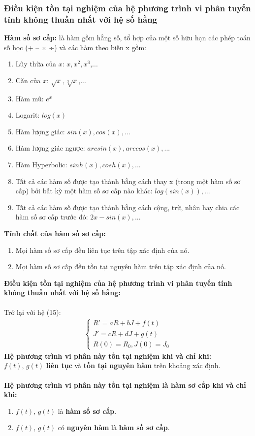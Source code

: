 \subsubsection{Điều kiện tồn tại nghiệm của hệ phương trình vi phân tuyến tính không thuần nhất với hệ số hằng}
\textbf{Hàm số sơ cấp: } là hàm gồm hằng số, tổ hợp của một số hữu hạn các phép toán số học (+ – × ÷) và các hàm theo biến x gồm:
\begin{enumerate}
    \item Lũy thừa của $x$: $x, x^2, x^3$,...
    \item Căn của $x$: $\sqrt{x}, \sqrt[3]{x}$,...
    \item Hàm mũ: $e^x$
    \item Logarit: $log(x)$
    \item Hàm lượng giác: $sin(x), cos(x),...$
    \item Hàm lượng giác ngược: $arcsin(x), arccos(x),...$
    \item Hàm Hyperbolic: $sinh(x),cosh(x),...$
    \item Tất cả các hàm số được tạo thành bằng cách thay x (trong một hàm số sơ cấp) bởi bất kỳ một hàm số sơ cấp nào khác: $log(sin(x)),...$
    \item Tất cả các hàm số được tạo thành bằng cách cộng, trừ, nhân hay chia các hàm số sơ cấp trước đó: $2x-sin(x),...$
\end{enumerate}
\textbf{Tính chất của hàm số sơ cấp:}
\begin{enumerate}
    \item Mọi hàm số sơ cấp đều liên tục trên tập xác định của nó.
    \item Mọi hàm số sơ cấp đều tồn tại nguyên hàm trên tập xác định của nó.
\end{enumerate}
\textbf{Điều kiện tồn tại nghiệm của hệ phương trình vi phân tuyến tính không
thuần nhất với hệ số hằng: }\\\\
Trở lại với hệ (15):
\begin{align*}
    \begin{cases}
        R'=aR+bJ+f(t)\\
        J'=cR+dJ+g(t)\\
        R(0)=R_0, J(0)=J_0
    \end{cases}
\end{align*}
\textbf{Hệ phương trình vi phân này tồn tại nghiệm khi và chỉ khi:}\\

$f(t)$, $g(t)$ \textbf{liên tục} và \textbf{tồn tại nguyên hàm} trên khoảng xác định.\\\\
\textbf{Hệ phương trình vi phân này tồn tại nghiệm là hàm sơ cấp khi và chỉ khi:}
\begin{enumerate}
    \item $f(t)$, $g(t)$ là \textbf{hàm số sơ cấp}.
    \item $f(t)$, $g(t)$ có \textbf{nguyên hàm} là \textbf{hàm số sơ cấp}.
\end{enumerate}
\vspace{0.7cm}
